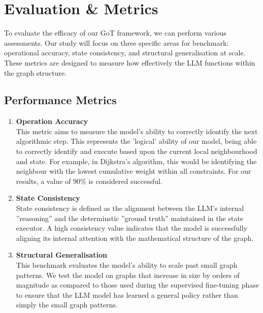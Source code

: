 \documentclass[sigplan,screen]{acmart}
\begin{document}
\section{Evaluation \& Metrics}
To evaluate the efficacy of our GoT framework, we can perform various assessments. Our study will focus on three specific areas for benchmark: operational accuracy, state consistency, and structural generalisation at scale. These metrics are designed to measure how effectively the LLM functions within the graph structure.

\subsection{Performance Metrics}
  \begin{enumerate}
    \item \textbf{Operation Accuracy} \\
      This metric aims to measure the model's ability to correctly identify the next algorithmic step. This represents the 'logical' ability of our model, being able to correctly identify and execute based upon the current local neighbourhood and state. For example, in Dijkstra's algorithm, this would be identifying the neighbour with the lowest cumulative weight within all constraints. For our results, a value of $90\%$ is considered successful.
    \item \textbf{State Consistency} \\
      State consistency is defined as the alignment between the LLM's internal ''reasoning'' and the determinstic ''ground truth'' maintained in the state executor. A high consistency value indicates that the model is successfully aligning its internal attention with the mathematical structure of the graph.
    \item \textbf{Structural Generalisation} \\
      This benchmark evaluates the model's ability to scale past small graph patterns. We test the model on graphs that increase in size by orders of magnitude as compared to those used during the supervised fine-tuning phase to ensure that the LLM model has learned a general policy rather than simply the small graph patterns.
  \end{enumerate}
\end{document}

